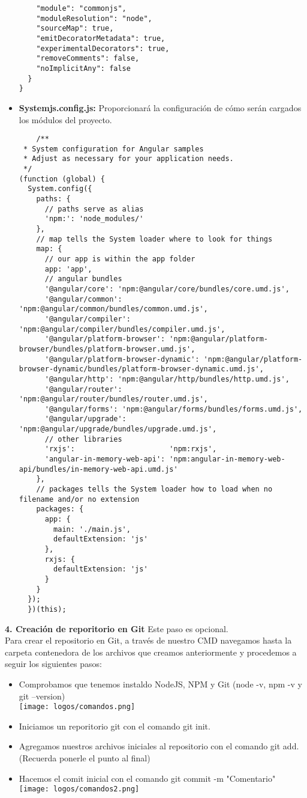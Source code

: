 \documentclass[openany]{book}
\begin{document}
\begin{itemize}
\begin{lstlisting}
    "module": "commonjs",
    "moduleResolution": "node",
    "sourceMap": true,
    "emitDecoratorMetadata": true,
    "experimentalDecorators": true,
    "removeComments": false,
    "noImplicitAny": false
  }
}
\end{lstlisting}
  \item \textbf{Systemjs.config.js:} Proporcionará la configuración de cómo serán cargados los módulos del proyecto.
  \begin{lstlisting}
    /**
 * System configuration for Angular samples
 * Adjust as necessary for your application needs.
 */
(function (global) {
  System.config({
    paths: {
      // paths serve as alias
      'npm:': 'node_modules/'
    },
    // map tells the System loader where to look for things
    map: {
      // our app is within the app folder
      app: 'app',
      // angular bundles
      '@angular/core': 'npm:@angular/core/bundles/core.umd.js',
      '@angular/common': 'npm:@angular/common/bundles/common.umd.js',
      '@angular/compiler': 'npm:@angular/compiler/bundles/compiler.umd.js',
      '@angular/platform-browser': 'npm:@angular/platform-browser/bundles/platform-browser.umd.js',
      '@angular/platform-browser-dynamic': 'npm:@angular/platform-browser-dynamic/bundles/platform-browser-dynamic.umd.js',
      '@angular/http': 'npm:@angular/http/bundles/http.umd.js',
      '@angular/router': 'npm:@angular/router/bundles/router.umd.js',
      '@angular/forms': 'npm:@angular/forms/bundles/forms.umd.js',
      '@angular/upgrade': 'npm:@angular/upgrade/bundles/upgrade.umd.js',
      // other libraries
      'rxjs':                      'npm:rxjs',
      'angular-in-memory-web-api': 'npm:angular-in-memory-web-api/bundles/in-memory-web-api.umd.js'
    },
    // packages tells the System loader how to load when no filename and/or no extension
    packages: {
      app: {
        main: './main.js',
        defaultExtension: 'js'
      },
      rxjs: {
        defaultExtension: 'js'
      }
    }
  });
  })(this);
  \end{lstlisting}
  \vspace*{5\baselineskip}
\end{itemize}
\textbf{4. Creación de reporitorio en Git} Este paso es opcional.
\\ Para crear el repositorio en Git, a través de nuestro CMD navegamos hasta la carpeta contenedora de los archivos que creamos anteriormente y procedemos a seguir los siguientes pasos: 
\begin{itemize}
  \item Comprobamos que tenemos instaldo NodeJS, NPM y Git (node -v, npm -v y git --version)
  \\ \texttt{[image: logos/comandos.png]}\\
  \item Iniciamos un reporitorio git con el comando git init.
  \item Agregamos nuestros archivos iniciales al repositorio con el comando git add. (Recuerda ponerle el punto al final)
  \item Hacemos el comit inicial con el comando git commit -m "Comentario"
  \\ \texttt{[image: logos/comandos2.png]}
\end{itemize}
\end{document}
